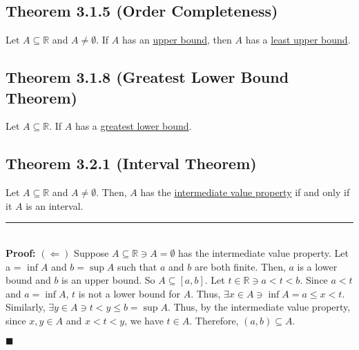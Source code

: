 \documentclass[11pt]{book}
\newcommand{\R}{\mathbb{R}}
\newcommand{\horline}{\noindent\rule{14.25cm}{0.6pt}\\}
\newcommand{\QED}{\begin{flushright}$\blacksquare$\end{flushright}}
\begin{document}
	\newpage
	\subsection{Theorem 3.1.5 (Order Completeness)}
	\label{subsec:theor315}
		\begin{theor}
			Let $A \subseteq \R$ and $A \neq \emptyset$. If $A$ has an \hyperref[subsec:upperbound]{upper bound}, then $A$ has a \hyperref[subsec:supremum]{least 
			upper bound}.
		\end{theor}
	\subsection{Theorem 3.1.8 (Greatest Lower Bound Theorem)}
	\label{subsec:theor318}
		\begin{theor}
			Let $A \subseteq \R$. If $A$ has a \hyperref[subsec:infimum]{greatest lower bound}.
		\end{theor}
	\subsection{Theorem 3.2.1 (Interval Theorem)}
	\label{subsec:theor321}
		\begin{theor}
			Let $A \subseteq \R$ and $A \neq \emptyset$. Then, $A$ has the \hyperref[subsec:intermediatevalueproperty]{intermediate value property} if and only if
			it $A$ is an interval.\hfill \break
			\horline
			\textbf{Proof:} $(\Leftarrow)$ Suppose $A \subseteq \R \ni A = \emptyset$ has the intermediate value property. Let a = $\inf{A}$ and $b = \sup{A}$ such 
			that $a$ and $b$ are both finite. Then, $a$ is a lower bound and $b$ is an upper bound. So $A \subseteq [a,b]$. Let $t \in \R \ni a < t < b$. Since 
			$a < t$ and $a = \inf{A}$, $t$ is not a lower bound for $A$. Thus, $\exists x \in A \ni \inf{A} = a \leq x < t$. Similarly, $\exists y \in A \ni 
			t < y \leq b = \sup{A}$. Thus, by the intermediate value property, since $x,y \in A$ and $x < t < y$, we have $t \in A$. Therefore, $(a,b) \subseteq A$.
			\QED
		\end{theor}
	\newpage		
\end{document}
